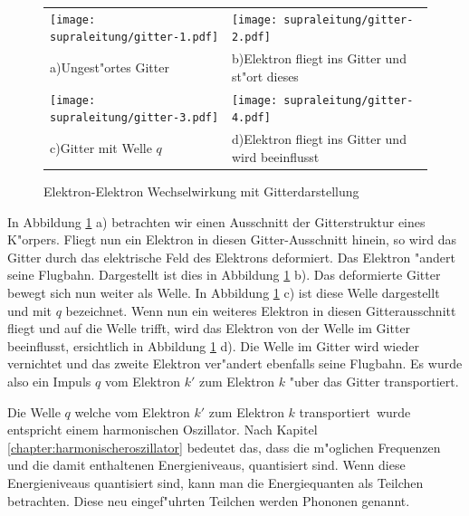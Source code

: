 \begin{refsection}
\begin{figure}
\centering
  \begin{tabular}{l l}
  \centering
    \begin{minipage}{0.48\textwidth}
	\texttt{[image: supraleitung/gitter-1.pdf]}
    \end{minipage}
    &
    \begin{minipage}{0.48\textwidth}
	\texttt{[image: supraleitung/gitter-2.pdf]}	
    \end{minipage}
    \\
    a)\quad Ungest"ortes Gitter
    &
    b)\quad Elektron fliegt ins Gitter und st"ort dieses
    \\
    \begin{minipage}{0.48\textwidth}
	\texttt{[image: supraleitung/gitter-3.pdf]}
    \end{minipage}
    &
    \begin{minipage}{0.48\textwidth}
	\texttt{[image: supraleitung/gitter-4.pdf]}
    \end{minipage}
    \\
    c)\quad Gitter mit Welle $q$
    &
    d)\quad Elektron fliegt ins Gitter und wird beeinflusst
    \\
  \end{tabular}
  \caption{Elektron-Elektron Wechselwirkung mit Gitterdarstellung
  \label{supraleitung:Gitter}}
\end{figure}

In Abbildung \ref{supraleitung:Gitter} a) betrachten wir einen Ausschnitt der Gitterstruktur eines K"orpers.
Fliegt nun ein Elektron in diesen Gitter-Ausschnitt hinein, so wird das Gitter durch das
elektrische Feld des Elektrons deformiert.
Das Elektron "andert seine Flugbahn.
Dargestellt ist dies in Abbildung \ref{supraleitung:Gitter} b).
Das deformierte Gitter bewegt sich nun weiter als Welle.
In Abbildung \ref{supraleitung:Gitter} c) ist diese Welle dargestellt und mit $q$ bezeichnet.
Wenn nun ein weiteres Elektron in diesen Gitterausschnitt fliegt und auf die Welle trifft,
wird das Elektron von der Welle im Gitter beeinflusst, ersichtlich in Abbildung \ref{supraleitung:Gitter} d).
Die Welle im Gitter wird wieder vernichtet und das zweite Elektron ver"andert
ebenfalls seine Flugbahn.
Es wurde also ein Impuls $q$ vom Elektron $k'$ zum Elektron $k$ "uber das Gitter transportiert. 

Die Welle $q$ welche vom Elektron $k'$ zum Elektron $k$ \glqq transportiert\grqq~wurde
entspricht einem harmonischen Oszillator.
Nach Kapitel \ref{chapter:harmonischeroszillator} bedeutet das, dass die m"oglichen Frequenzen
und die damit enthaltenen Energieniveaus, quantisiert sind.
Wenn diese Energieniveaus quantisiert sind, kann man die Energiequanten als Teilchen betrachten.
Diese neu eingef"uhrten Teilchen werden Phononen  genannt.


\end{refsection}
